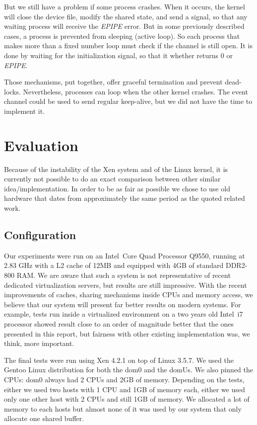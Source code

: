 \documentclass[journal]{IEEEtran}
\begin{document}
But we still have a problem if some process crashes. When it occurs, the kernel will close the device file, modify the shared state, and send a signal, so that any waiting process will receive the \emph{EPIPE} error. But in some previously described cases, a process is prevented from sleeping (active loop). So each process that makes more than a fixed number loop must check if the channel is still open. It is done by waiting for the initialization signal, so that it whether returns 0 or \emph{EPIPE}. 

Those mechanisms, put together, offer graceful termination and prevent dead-locks. Nevertheless, processes can loop when the other kernel crashes. The event channel could be used to send regular keep-alive, but we did not have the time to implement it.  

\section{Evaluation}

Because of the instability of the Xen system and of the Linux kernel, it is currently not possible to do an exact comparison between other similar idea/implementation. In order to be as fair as possible we chose to use old hardware that dates from approximately the same period as the quoted related work.

\subsection{Configuration}

Our experiments were run on an Intel\textregistered ~Core Quad Processor Q9550, running at 2.83 GHz with a L2 cache of 12MB and equipped with 4GB of standard DDR2-800 RAM. We are aware that such a system is not representative of recent dedicated virtualization servers, but results are still impressive.
With the recent improvements of caches, sharing mechanisms inside CPUs and memory access, we believe that our system will present far better results on modern systems. For example, tests run inside a virtualized environment on a two years old Intel\textregistered ~i7 processor showed result close to an order of magnitude better that the ones presented in this report, but fairness with other existing implementation was, we think, more important.

The final tests were run using Xen 4.2.1 on top of Linux 3.5.7. We used the Gentoo Linux distribution for both the dom0 and the domUs. We also pinned the CPUs: dom0 always had 2 CPUs and 2GB of memory. Depending on the tests, either we used two hosts with 1 CPU and 1GB of memory each, either we used only one other host with 2 CPUs and still 1GB of memory. We allocated a lot of memory to each hosts but almost none of it was used by our system that only allocate one shared buffer.
\end{document}
